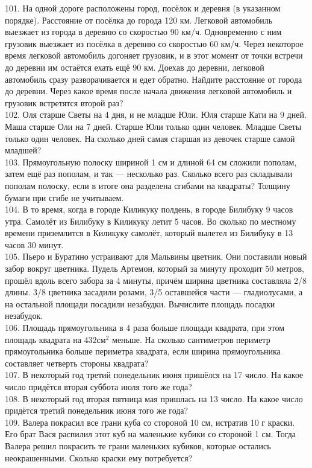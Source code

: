 101. На одной дороге расположены город, посёлок и деревня (в указанном порядке). Расстояние от посёлка до города 120 км. Легковой автомобиль выезжает из города в деревню со скоростью 90 км/ч. Одновременно с ним грузовик выезжает из посёлка в деревню со скоростью 60 км/ч. Через некоторое время легковой автомобиль догоняет грузовик, и в этот момент от точки встречи до деревни им остаётся ехать ещё 90 км. Доехав до деревни, легковой автомобиль сразу разворачивается и едет обратно. Найдите расстояние от города до деревни. Через какое время после начала движения легковой автомобиль и грузовик встретятся второй раз?\\
102. Оля старше Светы на 4 дня, и не младше Юли. Юля старше Кати на 9 дней. Маша старше Оли на 7 дней. Старше Юли только один человек. Младше Светы только один человек. На сколько дней самая старшая из девочек старше самой младшей?\\
103. Прямоугольную полоску шириной 1 см и длиной 64 см сложили пополам, затем ещё раз пополам, и так --- несколько раз. Сколько всего раз складывали пополам полоску, если в итоге она разделена сгибами на квадраты? Толщину бумаги при сгибе не учитываем.\\
104. В то время, когда в городе Киликуку полдень, в городе Билибуку 9 часов утра. Самолёт из Билибуку в Киликуку летит 5 часов. Во сколько по местному времени приземлится в Киликуку самолёт, который вылетел из Билибуку в 13 часов 30 минут.\\
105. Пьеро и Буратино устраивают для Мальвины цветник. Они поставили новый забор вокруг цветника. Пудель Артемон, который за минуту проходит 50 метров, прошёл вдоль всего забора за 4 минуты, причём ширина цветника составляла 2/8 длины. 3/8 цветника засадили розами, 3/5 оставшейся части --- гладиолусами, а на остальной площади посадили незабудки. Вычислите площадь посадки незабудок.\\
106. Площадь прямоугольника в 4 раза больше площади квадрата, при этом площадь квадрата на $432\text{см}^2$ меньше. На сколько сантиметров периметр прямоугольника больше периметра квадрата, если ширина прямоугольника составляет четверть стороны квадрата?\\
107. В некоторый год третий понедельник июня пришёлся на 17 число. На какое число придётся вторая суббота июля того же года?\\
108. В некоторый год вторая пятница мая пришлась на 13 число. На какое число придётся третий понедельник июня того же года?\\
109. Валера покрасил все грани куба со стороной 10 см, истратив 10 г краски. Его брат Вася распилил этот куб на маленькие кубики со стороной 1 см. Тогда Валера решил покрасить те грани маленьких кубиков, которые остались неокрашенными. Сколько краски ему потребуется?\\
